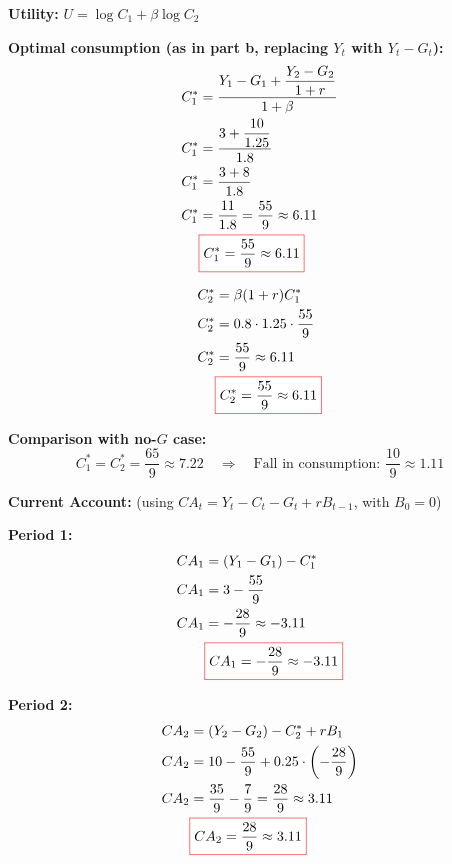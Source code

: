\documentclass[12pt]{article}
\begin{document}
\textbf{Utility:} \( U = \log C_1 + \beta \log C_2 \)

\textbf{Optimal consumption (as in part b, replacing \( Y_t \) with \( Y_t - G_t \)):}
\begin{align*}
C_1^* &= \frac{Y_1 - G_1 + \dfrac{Y_2 - G_2}{1 + r}}{1 + \beta} \\
C_1^* &= \frac{3 + \dfrac{10}{1.25}}{1.8} \\
C_1^* &= \frac{3 + 8}{1.8} \\
C_1^* &= \frac{11}{1.8} = \frac{55}{9} \approx 6.11 \\
&\fcolorbox{red}{white}{$\displaystyle C_1^* = \frac{55}{9} \approx 6.11$}
\end{align*}

\vspace{1em}
\begin{align*}
C_2^* &= \beta(1 + r) C_1^* \\
C_2^* &= 0.8 \cdot 1.25 \cdot \frac{55}{9} \\
C_2^* &= \frac{55}{9} \approx 6.11 \\
&\fcolorbox{red}{white}{$\displaystyle C_2^* = \frac{55}{9} \approx 6.11$}
\end{align*}

\textbf{Comparison with no-\( G \) case:}
\[
C_1^* = C_2^* = \frac{65}{9} \approx 7.22 \quad \Rightarrow \quad \text{Fall in consumption: } \frac{10}{9} \approx 1.11
\]

\vspace{1em}
\textbf{Current Account:} (using \( CA_t = Y_t - C_t - G_t + r B_{t-1} \), with \( B_0 = 0 \))

\textbf{Period 1:}
\begin{align*}
CA_1 &= (Y_1 - G_1) - C_1^* \\
CA_1 &= 3 - \frac{55}{9} \\
CA_1 &= -\frac{28}{9} \approx -3.11 \\
&\fcolorbox{red}{white}{$\displaystyle CA_1 = -\frac{28}{9} \approx -3.11$}
\end{align*}

\vspace{1em}
\textbf{Period 2:}
\begin{align*}
CA_2 &= (Y_2 - G_2) - C_2^* + r B_1 \\
CA_2 &= 10 - \frac{55}{9} + 0.25 \cdot \left(-\frac{28}{9} \right) \\
CA_2 &= \frac{35}{9} - \frac{7}{9} = \frac{28}{9} \approx 3.11 \\
&\fcolorbox{red}{white}{$\displaystyle CA_2 = \frac{28}{9} \approx 3.11$}
\end{align*}
\end{document}
